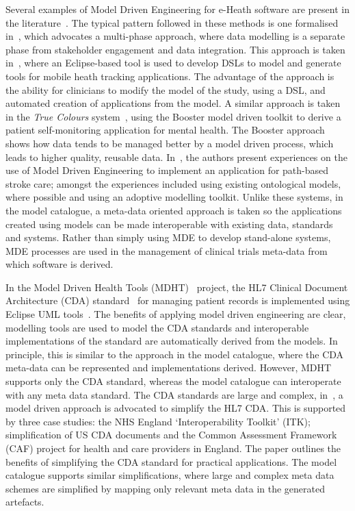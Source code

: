 Several examples of Model Driven Engineering for e-Heath software are present in the literature~\cite{dav14,ragh08,blob07,kham08,schl15}. The typical pattern followed in these methods is one formalised in~\cite{pay12}, which advocates a multi-phase approach, where data modelling is a separate phase from stakeholder engagement and data integration. This approach is taken in~\cite{kham08}, where an Eclipse-based tool is used to develop DSLs to model and generate tools for mobile heath tracking applications. The advantage of the approach is the ability for clinicians to modify the model of the study, using a DSL, and automated creation of applications from the model. A similar approach is taken in the \emph{True Colours} system~\cite{dav14}, using the Booster model driven toolkit to derive a patient self-monitoring application for mental health. The Booster approach shows how data tends to be managed better by a model driven process, which leads to higher quality, reusable data. In~\cite{schl15}, the authors present experiences on the use of Model Driven Engineering to implement an application for path-based stroke care; amongst the experiences included using existing ontological models, where possible and using an adoptive modelling toolkit. Unlike these systems, in the model catalogue, a meta-data oriented approach is taken so the applications created using models can be made interoperable with existing data, standards and systems. Rather than simply using MDE to develop stand-alone systems, MDE processes are used in the management of clinical trials meta-data from which software is derived. 

In the Model Driven Health Tools (MDHT)~\cite{MDHT} project, the HL7 Clinical Document Architecture (CDA) standard~\cite{doli06} for managing patient records is implemented using Eclipse UML tools~\cite{EUML}. The benefits of applying model driven engineering are clear, modelling tools are used to model the CDA standards and interoperable implementations of the standard are automatically derived from the models. In principle, this is similar to the approach in the model catalogue, where the CDA meta-data can be represented and implementations derived. However, MDHT supports only the CDA standard, whereas the model catalogue can interoperate with any meta data standard. The CDA standards are large and complex, in~\cite{sco12}, a model driven approach is advocated to simplify the HL7 CDA. This is supported by three case studies: the NHS England ‘Interoperability Toolkit’ (ITK); simplification of US CDA documents and the Common Assessment Framework (CAF) project for health and care providers in England. The paper outlines the benefits of simplifying the CDA standard for practical applications. The model catalogue supports similar simplifications, where large and complex meta data schemes are simplified by mapping only relevant meta data in the generated artefacts.


